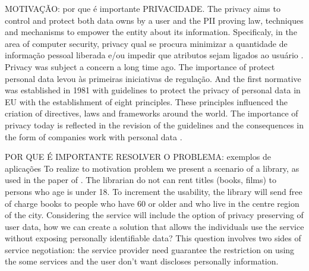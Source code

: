\documentclass{doublecol-new}
\begin{document}
MOTIVAÇÃO: por que é importante PRIVACIDADE.
The privacy aims to control and protect both data owns by a user and the PII proving law, techniques and mechanisms to empower the entity about its information. Specificaly, in the area of computer security, privacy qual se procura minimizar a quantidade de informação pessoal liberada e/ou impedir que atributos sejam ligados ao usuário \citep{gurses2011engineering,heurix2015taxonomy,landwehr2012privacy}. Privacy was subject a concern a long time ago. The importance of protect personal data levou às primeiras iniciativas de regulação. And the first normative was established in 1981 with guidelines to protect the privacy of personal data in EU \citep{oecd1981guidelines} with the establishment of eight principles. These principles influenced the criation of directives, laws and frameworks around the world. The importance of privacy today is reflected in the revision of the guidelines \citep{oecd2013guidelinesupdated} and the consequences in the form of companies work with personal data \citep{kuschewsky2014new}. 

POR QUE É IMPORTANTE RESOLVER O PROBLEMA: exemplos de aplicações
To realize to motivation problem we present a scenario of a library, as used in the paper of \citep{camenisch2014concepts}. The librarian do not can rent titles (books, films) to persons who age is under 18. To increment the usability, the library will send free of charge books to people who have 60 or older and who live in the centre region of the city. Considering the service will include the option of privacy preserving of user data, how we can create a solution that allows the individuals use the service without exposing personally identifiable data? This question involves two sides of service negotiation: the service provider need guarantee the restriction on using the some services and the user don't want discloses personally information.
\end{document}
